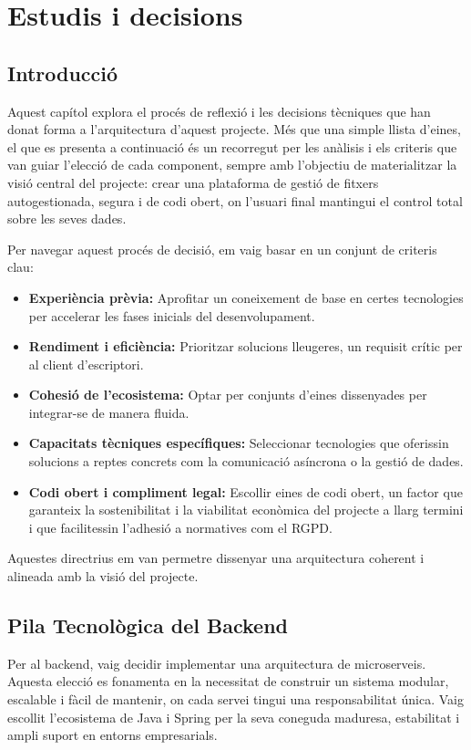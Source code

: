 \chapter{Estudis i decisions}
\label{chap:estudis_decisions}

\section{Introducció}
Aquest capítol explora el procés de reflexió i les decisions tècniques que han donat forma a l'arquitectura d'aquest projecte. Més que una simple llista d'eines, el que es presenta a continuació és un recorregut per les anàlisis i els criteris que van guiar l'elecció de cada component, sempre amb l'objectiu de materialitzar la visió central del projecte: crear una plataforma de gestió de fitxers autogestionada, segura i de codi obert, on l'usuari final mantingui el control total sobre les seves dades.

Per navegar aquest procés de decisió, em vaig basar en un conjunt de criteris clau:
\begin{itemize}
\item \textbf{Experiència prèvia:} Aprofitar un coneixement de base en certes tecnologies per accelerar les fases inicials del desenvolupament.
\item \textbf{Rendiment i eficiència:} Prioritzar solucions lleugeres, un requisit crític per al client d'escriptori.
\item \textbf{Cohesió de l'ecosistema:} Optar per conjunts d'eines dissenyades per integrar-se de manera fluida.
\item \textbf{Capacitats tècniques específiques:} Seleccionar tecnologies que oferissin solucions a reptes concrets com la comunicació asíncrona o la gestió de dades.
\item \textbf{Codi obert i compliment legal:} Escollir eines de codi obert,  un factor que garanteix la sostenibilitat i la viabilitat econòmica del projecte a llarg termini i que facilitessin l'adhesió a normatives com el RGPD.
\end{itemize}

Aquestes directrius em van permetre dissenyar una arquitectura coherent i alineada amb la visió del projecte.

\section{Pila Tecnològica del Backend}
Per al backend, vaig decidir implementar una arquitectura de microserveis. Aquesta elecció es fonamenta en la necessitat de construir un sistema modular, escalable i fàcil de mantenir, on cada servei tingui una responsabilitat única. Vaig escollit l'ecosistema de Java i Spring per la seva coneguda maduresa, estabilitat i ampli suport en entorns empresarials. 

